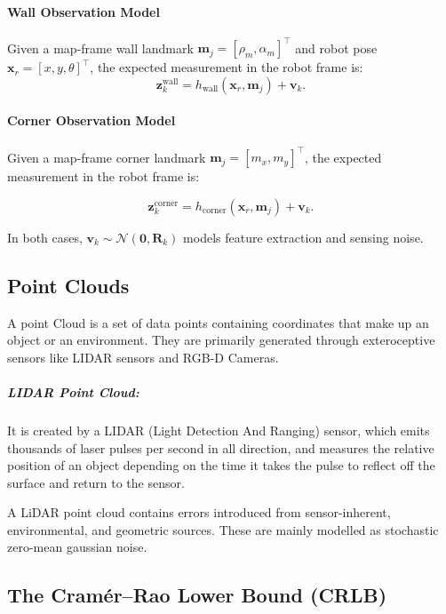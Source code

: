 \documentclass[11pt]{article}
\begin{document}
\paragraph{Wall Observation Model}
Given a map-frame wall landmark $\mathbf{m}_j = [\rho_m, \alpha_m]^\top$ and robot pose $\mathbf{x}_r = [x, y, \theta]^\top$, the expected measurement in the robot frame is:
\begin{equation}
	\mathbf{z}_k^{\text{wall}} = h_{\text{wall}}(\mathbf{x}_r,\mathbf{m}_j) + \mathbf{v}_k.
\end{equation}

\paragraph{Corner Observation Model}
Given a map-frame corner landmark $\mathbf{m}_j = [m_x, m_y]^\top$, the expected measurement in the robot frame is:

\begin{equation}
	\mathbf{z}_k^{\text{corner}} = h_{\text{corner}}(\mathbf{x}_r,\mathbf{m}_j) + \mathbf{v}_k.
\end{equation}

In both cases, $\mathbf{v}_k \sim \mathcal{N}(\mathbf{0}, \mathbf{R}_k)$ models feature extraction and sensing noise.

\subsection{Point Clouds}
A point Cloud is a set of data points containing coordinates that make up an object or an environment. They are primarily generated through exteroceptive sensors like LIDAR sensors and RGB-D Cameras. 

\subparagraph{LIDAR Point Cloud:} It is created by a LIDAR (Light Detection And Ranging) sensor, which emits thousands of laser pulses per second in all direction, and measures the relative position of an object depending on the time it takes the pulse to reflect off the surface and return to the sensor.

A LiDAR point cloud contains errors introduced from sensor-inherent, environmental, and geometric sources. These are mainly modelled as stochastic zero-mean gaussian noise.


\subsection{The Cramér–Rao Lower Bound (CRLB)}
\end{document}
